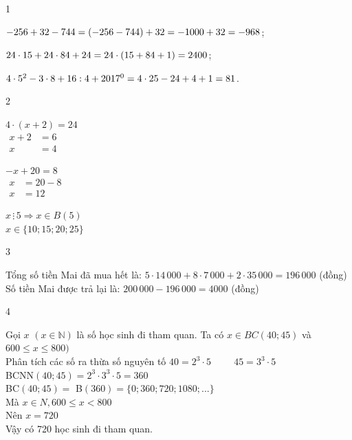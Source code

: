 \begin{Solbook}{1}
 \par \noindent  \begin {listEX}[3] \item $-256 + 32 - 744 \\= (-256 -744) + 32 \\= -1000 + 32 = -968$; \item $24\cdot 15 + 24\cdot 84 + 24\\ = 24 \cdot (15 + 84 + 1) \\= 2400$; \item $4\cdot 5^2 - 3\cdot 8 + 16:4 + 2017^0 \\= 4\cdot 25 - 24 + 4 + 1 \\= 81$. \end {listEX}  \hfill \qedEX 
\end{Solbook}
\begin{Solbook}{2}
 \par \noindent  \begin {listEX}[3] \item $4\cdot (x + 2) = 24$\\ \hspace *{0.85 cm}$\begin {aligned} x + 2 &= 6\\ x &= 4 \end {aligned}$ \item $-x + 20 = 8$\\ \hspace *{1.25 cm}$\begin {aligned} x &= 20-8\\ x &= 12 \end {aligned}$ \item $x\,\vdots \,5 \Rightarrow x \in B(5)$\\ $x \in \{10;15;20;25\}$ \end {listEX}  \hfill \qedEX 
\end{Solbook}
\begin{Solbook}{3}
 \par \noindent  Tổng số tiền Mai đã mua hết là: $5\cdot 14\,000 + 8\cdot 7\,000 + 2\cdot 35\,000 = 196\,000$ (đồng) \\Số tiền Mai được trả lại là: $200\,000 - 196\,000 = 4000$ (đồng)  \hfill \qedEX 
\end{Solbook}
\begin{Solbook}{4}
 \par \noindent  Gọi $x$ $(x\in \mathbb {N})$ là số học sinh đi tham quan. Ta có $x \in BC(40;45)$ và $600 \leqslant x \leqslant 800)$\\ Phân tích các số ra thừa số nguyên tố $40=2^3\cdot 5 \hspace {1cm}45=3^3\cdot 5$ \\ BCNN$(40;45) =2^3\cdot 3^3\cdot 5= 360$ \\BC$(40;45) =$ B$(360)=\{0; 360;720;1080;... \}$ \\Mà $x \in N, 600 \leqslant x < 800$ \\Nên $x = 720$\\ Vậy có 720 học sinh đi tham quan.  \hfill \qedEX 
\end{Solbook}
